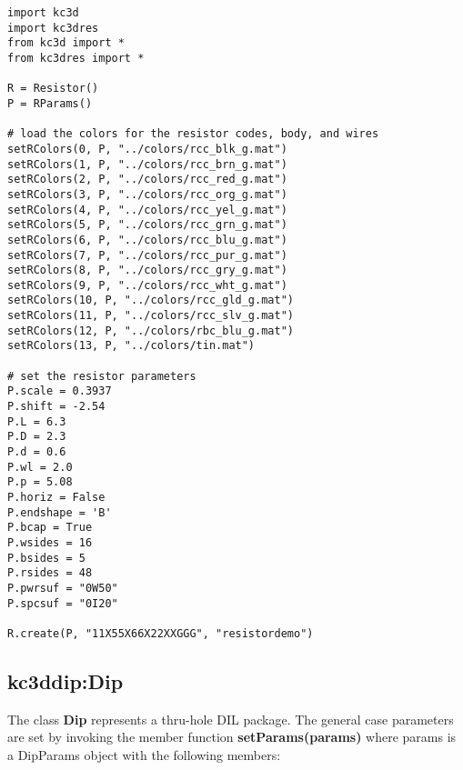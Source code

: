 \documentclass[a4paper, dvipdfm]{article}
\begin{document}
\begin{verbatim}
import kc3d
import kc3dres
from kc3d import *
from kc3dres import *

R = Resistor()
P = RParams()

# load the colors for the resistor codes, body, and wires
setRColors(0, P, "../colors/rcc_blk_g.mat")
setRColors(1, P, "../colors/rcc_brn_g.mat")
setRColors(2, P, "../colors/rcc_red_g.mat")
setRColors(3, P, "../colors/rcc_org_g.mat")
setRColors(4, P, "../colors/rcc_yel_g.mat")
setRColors(5, P, "../colors/rcc_grn_g.mat")
setRColors(6, P, "../colors/rcc_blu_g.mat")
setRColors(7, P, "../colors/rcc_pur_g.mat")
setRColors(8, P, "../colors/rcc_gry_g.mat")
setRColors(9, P, "../colors/rcc_wht_g.mat")
setRColors(10, P, "../colors/rcc_gld_g.mat")
setRColors(11, P, "../colors/rcc_slv_g.mat")
setRColors(12, P, "../colors/rbc_blu_g.mat")
setRColors(13, P, "../colors/tin.mat")

# set the resistor parameters
P.scale = 0.3937
P.shift = -2.54
P.L = 6.3
P.D = 2.3
P.d = 0.6
P.wl = 2.0
P.p = 5.08
P.horiz = False
P.endshape = 'B'
P.bcap = True
P.wsides = 16
P.bsides = 5
P.rsides = 48
P.pwrsuf = "0W50"
P.spcsuf = "0I20"

R.create(P, "11X55X66X22XXGGG", "resistordemo")
\end{verbatim}

\subsection{kc3ddip:Dip}
The class \textbf{Dip} represents a thru-hole DIL package. The general
case parameters are set by invoking the member function \textbf{setParams(params)} where
params is a DipParams object with the following members:
\end{document}
